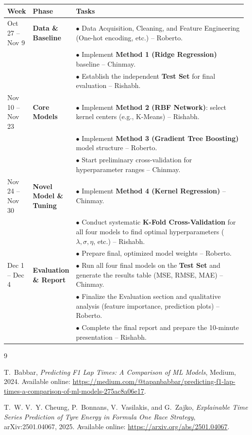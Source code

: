 \documentclass[english]{article}
\begin{document}
\begin{table}[h]
\centering
\begin{tabular}{|p{0.08\linewidth}|p{0.12\linewidth}|p{0.78\linewidth}|}
\hline
	\textbf{Week} & \textbf{Phase} & \textbf{Tasks} \\
\hline
Oct 27 -- Nov 9 & \textbf{Data \& Baseline} & $\bullet$ Data Acquisition, Cleaning, and Feature Engineering (One-hot encoding, etc.) -- Roberto. \\
& & $\bullet$ Implement \textbf{Method 1 (Ridge Regression)} baseline -- Chinmay. \\
& & $\bullet$ Establish the independent \textbf{Test Set} for final evaluation -- Rishabh. \\
\hline
Nov 10 -- Nov 23 & \textbf{Core Models} & $\bullet$ Implement \textbf{Method 2 (RBF Network)}: select kernel centers (e.g., K-Means) -- Rishabh. \\
& & $\bullet$ Implement \textbf{Method 3 (Gradient Tree Boosting)} model structure -- Roberto. \\
& & $\bullet$ Start preliminary cross-validation for hyperparameter ranges -- Chinmay. \\
\hline
Nov 24 -- Nov 30 & \textbf{Novel Model \& Tuning} & $\bullet$ Implement \textbf{Method 4 (Kernel Regression)} -- Chinmay. \\
& & $\bullet$ Conduct systematic \textbf{K-Fold Cross-Validation} for all four models to find optimal hyperparameters ($\lambda, \sigma, \eta$, etc.) -- Rishabh. \\
& & $\bullet$ Prepare final, optimized model weights -- Roberto. \\
\hline
Dec 1 -- Dec 4 & \textbf{Evaluation \& Report} & $\bullet$ Run all four final models on the \textbf{Test Set} and generate the results table (MSE, RMSE, MAE) -- Chinmay. \\
& & $\bullet$ Finalize the Evaluation section and qualitative analysis (feature importance, prediction plots) -- Roberto. \\
& & $\bullet$ Complete the final report and prepare the 10-minute presentation -- Rishabh. \\
\hline
\end{tabular}
\end{table}


\newpage


\begin{thebibliography}{9}

T.~Babbar, \emph{Predicting F1 Lap Times: A Comparison of ML Models}, Medium, 2024.
Available online: \url{https://medium.com/@tapanbabbar/predicting-f1-lap-times-a-comparison-of-ml-models-275ac8a06e17}.

T.~W. V.~Y. Cheung, P.~Bonnans, V.~Vasilakis, and G.~Zajko, \emph{Explainable Time Series Prediction of Tyre Energy in Formula One Race Strategy}, arXiv:2501.04067, 2025.
Available online: \url{https://arxiv.org/abs/2501.04067}.

\end{thebibliography}
\end{document}
